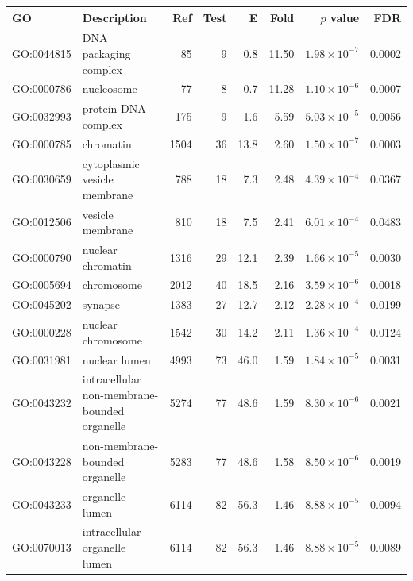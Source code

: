 
\begin{table}[ht]
\centering
 \setlength{\extrarowheight}{2pt}
\begin{adjustbox}{width=\textwidth}

\begin{tabular}{llrrrrrr}
\toprule
GO & Description & Ref & Test & E & Fold & $p$ value & FDR \\ 
  \midrule
GO:0044815 & DNA packaging complex  & 85 & 9 & 0.8 & 11.50 & $1.98 \times 10^{-7}$ & 0.0002 \\ 
  GO:0000786 & nucleosome  & 77 & 8 & 0.7 & 11.28 & $1.10 \times 10^{-6}$ & 0.0007 \\ 
  GO:0032993 & protein-DNA complex  & 175 & 9 & 1.6 & 5.59 & $5.03 \times 10^{-5}$ & 0.0056 \\ 
  GO:0000785 & chromatin  & 1504 & 36 & 13.8 & 2.60 & $1.50 \times 10^{-7}$ & 0.0003 \\ 
  GO:0030659 & cytoplasmic vesicle membrane  & 788 & 18 & 7.3 & 2.48 & $4.39 \times 10^{-4}$ & 0.0367 \\ 
  GO:0012506 & vesicle membrane  & 810 & 18 & 7.5 & 2.41 & $6.01 \times 10^{-4}$ & 0.0483 \\ 
  GO:0000790 & nuclear chromatin  & 1316 & 29 & 12.1 & 2.39 & $1.66 \times 10^{-5}$ & 0.0030 \\ 
  GO:0005694 & chromosome  & 2012 & 40 & 18.5 & 2.16 & $3.59 \times 10^{-6}$ & 0.0018 \\ 
  GO:0045202 & synapse  & 1383 & 27 & 12.7 & 2.12 & $2.28 \times 10^{-4}$ & 0.0199 \\ 
  GO:0000228 & nuclear chromosome  & 1542 & 30 & 14.2 & 2.11 & $1.36 \times 10^{-4}$ & 0.0124 \\ 
  GO:0031981 & nuclear lumen  & 4993 & 73 & 46.0 & 1.59 & $1.84 \times 10^{-5}$ & 0.0031 \\ 
  GO:0043232 & intracellular non-membrane-bounded organelle  & 5274 & 77 & 48.6 & 1.59 & $8.30 \times 10^{-6}$ & 0.0021 \\ 
  GO:0043228 & non-membrane-bounded organelle  & 5283 & 77 & 48.6 & 1.58 & $8.50 \times 10^{-6}$ & 0.0019 \\ 
  GO:0043233 & organelle lumen  & 6114 & 82 & 56.3 & 1.46 & $8.88 \times 10^{-5}$ & 0.0094 \\ 
  GO:0070013 & intracellular organelle lumen  & 6114 & 82 & 56.3 & 1.46 & $8.88 \times 10^{-5}$ & 0.0089 \\ 

\end{tabular}
\end{adjustbox}
\end{table}

